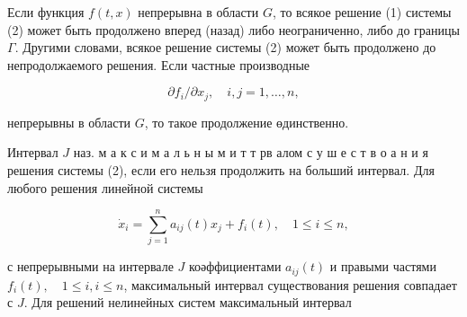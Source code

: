 \documentclass[10pt]{article}
\begin{document}
Если функция $f(t, x)$ непрерывна в области $G$, то всякое решение (1) системы (2) может быть продолжено вперед (назад) либо неограниченно, либо до границы $\Gamma$. Другими словами, всякое решение системы (2) может быть продолжено до непродолжаемого решения. Если частные производные



\[

\partial f_{i} / \partial x_{j}, \quad i, j=1, \ldots, n,

\]



непрерывны в области $G$, то такое продолжение өдинственно.



Интервал $J$ наз. м а к с и м а л ь н ы м и т т рв алом с у ш е с т в о а н и я решения системы (2), если его нельзя продолжить на больший интервал. Для любого решения линейной системы



\[

\dot{x}_{i}=\sum_{j=1}^{n} a_{i j}(t) x_{j}+f_{i}(t), \quad 1 \leqslant i \leqslant n,

\]



с непрерывными на интервале $J$ коәффициентами $a_{i j}(t)$ и правыми частями $f_{i}(t), \quad 1 \leqslant i, i \leqslant n$, максимальный интервал существования решения совпадает с $J$. Для решений нелинейных систем максимальный интервал
\end{document}
